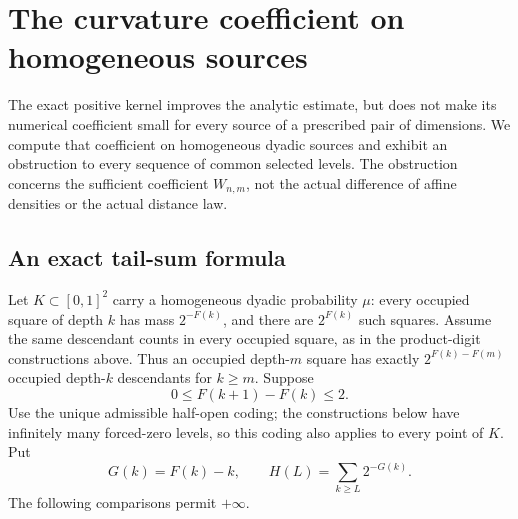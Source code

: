 \section{The curvature coefficient on homogeneous sources}
\label{curvatureobs:section}

The exact positive kernel improves the analytic estimate, but does not
make its numerical coefficient small for every source of a prescribed
pair of dimensions. We compute that coefficient on homogeneous dyadic
sources and exhibit an obstruction to every sequence of common selected
levels. The obstruction concerns the sufficient coefficient \(W_{n,m}\),
not the actual difference of affine densities or the actual distance law.

\subsection{An exact tail-sum formula}

Let \(K\subset[0,1]^2\) carry a homogeneous dyadic probability \(\mu\):
every occupied square of depth \(k\) has mass \(2^{-F(k)}\), and there
are \(2^{F(k)}\) such squares. Assume the same descendant counts in
every occupied square, as in the product-digit constructions above.
Thus an occupied depth-\(m\) square has exactly
\(2^{F(k)-F(m)}\) occupied depth-\(k\) descendants for \(k\ge m\).
Suppose
\[
 0\le F(k+1)-F(k)\le2.
\]
Use the unique admissible half-open coding; the constructions below have
infinitely many forced-zero levels, so this coding also applies to every
point of \(K\). Put
\begin{equation}\label{curvatureobs:tail}
 G(k)=F(k)-k,\qquad
 H(L)=\sum_{k\ge L}2^{-G(k)}.
\end{equation}
The following comparisons permit \(+\infty\).

